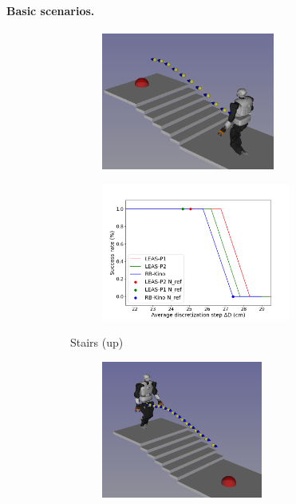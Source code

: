 \paragraph{Basic scenarios.\label{subsub:mip:basic_scenarios}}
\begin{figure}[h!]
    \centering
    \captionsetup[subfigure]{justification=centering}
    \begin{subfigure}{0.9\linewidth}
        \centering
        \begin{subfigure}{0.48\linewidth}
            \includegraphics[trim={0cm 0cm 0cm 0cm},clip,width=\textwidth,height=4.5cm]{Figures/Chapter_MIP_SL1M/res_mip/scenario_stairs.png}
        \end{subfigure}
        \begin{subfigure}{0.48\linewidth}
            \includegraphics[trim={0cm 0cm 2cm 1.8cm}, clip,width=\textwidth,height=4.5cm]{Figures/Chapter_MIP_SL1M/res_mip/MIP_stairs/FIGURE_MIP_STAIRS_2.png}
        \end{subfigure}
        \caption{Stairs (up)}
        \label{fig:mip:minimizing_basic:0}
    \end{subfigure}
    \begin{subfigure}{0.9\linewidth}
        \centering
        \begin{subfigure}{0.48\linewidth}
            \includegraphics[trim={1cm 0cm 0cm 0cm},clip,width=\textwidth,height=4.5cm]{Figures/Chapter_MIP_SL1M/res_mip/stairs_down.png}

\end{subfigure}
\end{subfigure}
\end{figure}
